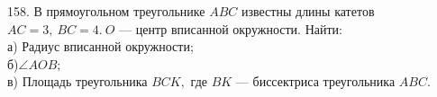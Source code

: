 158. В прямоугольном треугольнике $ABC$ известны длины катетов $AC=3,\ BC=4.\ O$ --- центр вписанной окружности. Найти:\\
а) Радиус вписанной окружности;\\
б)$\angle AOB;$\\
в) Площадь треугольника $BCK,$ где $BK$ --- биссектриса треугольника $ABC.$\\
